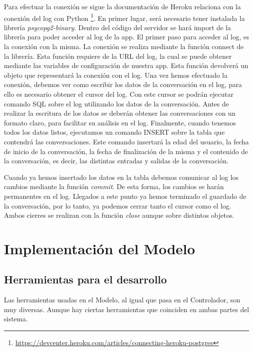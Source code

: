 Para efectuar la conexión se sigue la documentación de Heroku relaciona con la conexión del log con Python \footnote{\href{https://devcenter.heroku.com/articles/connecting-heroku-postgres#connecting-in-python}{https://devcenter.heroku.com/articles/connecting-heroku-postgres}}. En primer lugar, será necesario tener instalada la librería \textit{psycopg2-binary}. Dentro del código del servidor se hará import de la librería para poder acceder al log de la app. El primer paso para acceder al log, es la conexión con la misma. La conexión se realiza mediante la función connect de la librería. Esta función requiere de la URL del log, la cual se puede obtener mediante las variables de configuración de nuestra app. Esta función devolverá un objeto que representará la conexión con el log. Una vez hemos efectuado la conexión, debemos ver como escribir los datos de la conversación en el log, para ello es necesario obtener el cursor del log. Con este cursor se podrán ejecutar comando SQL sobre el log utilizando los datos de la conversación. Antes de realizar la escritura de los datos se deberán obtener las conversaciones con un formato claro, para facilitar su análisis en el log. Finalmente, cuando tenemos todos los datos listos, ejecutamos un comando INSERT sobre la tabla que contendrá las conversaciones. Este comando insertará la edad del usuario, la fecha de inicio de la conversación, la fecha de finalización de la misma y el contenido de la conversación, es decir, las distintas entradas y salidas de la conversación.

Cuando ya hemos insertado los datos en la tabla debemos comunicar al log los cambios mediante la función \textit{commit}. De esta forma, los cambios se harán permanentes en el log. Llegados a este punto ya hemos terminado el guardado de la conversación, por lo tanto, ya podemos cerrar tanto el cursor como el log. Ambos cierres se realizan con la función \textit{close} aunque sobre distintos objetos.


\section{Implementación del Modelo} \label{sec:implementacion_modelo}

\subsection{Herramientas para el desarrollo}

Las herramientas usadas en el Modelo, al igual que pasa en el Controlador, son muy diversas. Aunque hay ciertas herramientas que coinciden en ambas partes del sistema.

